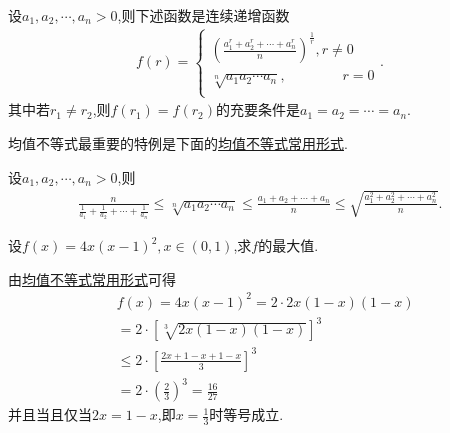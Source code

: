 \documentclass[../../main.tex]{subfiles}%
\begin{document}
\begin{theorem}[均值不等式]\label{theorem:均值不等式}
设$a_1,a_2,\cdots,a_n>0$,则下述函数是连续递增函数
\begin{align}
f\left( r \right) =\begin{cases}
\left( \frac{a_{1}^{r}+a_{2}^{r}+\cdots +a_{n}^{r}}{n} \right) ^{\frac{1}{r}},r\ne 0\\
\sqrt[n]{a_1a_2\cdots a_n},\,\,\,\,\,\,\,\,\,\,\,\,\,\,\,\,\,\,\,\,\,\,\,\,r=0\\
\end{cases}.
\end{align}
其中若$r_1\ne r_2$,则$f(r_1)=f(r_2)$的充要条件是$a_1=a_2=\cdots=a_n$.
\end{theorem}
\begin{note}
均值不等式最重要的特例是下面的\hyperref[theorem:均值不等式常用形式]{均值不等式常用形式}.
\end{note}
\begin{theorem}[均值不等式常用形式]\label{theorem:均值不等式常用形式}
设$a_1,a_2,\cdots,a_n>0$,则
\begin{align*}
\frac{n}{\frac{1}{a_1}+\frac{1}{a_2}+\cdots +\frac{1}{a_n}}\leqslant \sqrt[n]{a_1a_2\cdots a_n}\leqslant \frac{a_1+a_2+\cdots +a_n}{n}\leqslant \sqrt{\frac{a_{1}^{2}+a_{2}^{2}+\cdots +a_{n}^{2}}{n}}.
\end{align*}
\end{theorem}

\begin{example}
设$f(x)=4x(x-1)^2,x\in(0,1)$,求$f$的最大值.
\end{example}
\begin{solution}

由\hyperref[theorem:均值不等式常用形式]{均值不等式常用形式}可得
\begin{align*}
&f\left( x \right) =4x\left( x-1 \right) ^2=2\cdot 2x\left( 1-x \right) \left( 1-x \right) 
\\
&= 2\cdot \left[ \sqrt[3]{2x\left( 1-x \right) \left( 1-x \right)} \right] ^3
\\
&\leqslant 2\cdot \left[ \frac{2x+1-x+1-x}{3} \right] ^3
\\
&=2\cdot \left( \frac{2}{3} \right) ^3=\frac{16}{27}
\end{align*}
并且当且仅当$2x=1-x$,即$x=\frac{1}{3}$时等号成立.

\end{solution}
\end{document}
